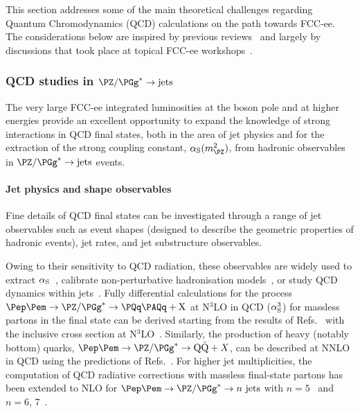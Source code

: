This section addresses some of the main theoretical challenges regarding Quantum Chromodynamics (QCD) calculations on the path towards FCC-ee.
The considerations below are inspired by previous reviews~\cite{Monni:2021rcz} 
and largely by discussions that took place at topical FCC-ee workshops~\cite{EWPrecisionWshop,QCDPrecisionWshop}.

\subsubsection{QCD studies in \texorpdfstring{$\PZ/\PGg^*\to \text{jets}$}{Z/gamma* to jets}}
\label{sec:QCDZdec}

The very large FCC-ee integrated luminosities at the \PZ boson pole and at higher energies 
provide an excellent opportunity to expand the
knowledge of strong interactions in QCD final states, 
both in the area of jet physics and for the extraction of the strong coupling constant, $\as(m^2_{\PZ})$, 
from hadronic observables in $\PZ/\PGg^* \to \text{jets}$ events.

\paragraph{Jet physics and shape observables}
\label{sec:evshp}

Fine details of QCD final states can be investigated through a range of jet observables 
such as event shapes (designed to describe the geometric properties of hadronic events), 
jet rates, and jet substructure observables.

Owing to their sensitivity to QCD radiation, 
these observables are widely used to extract $\alpha_{\rm S}$~\cite{dEnterria:2022hzv}, 
calibrate non-perturbative hadronisation models~\cite{Dasgupta:2003iq},  
or study QCD dynamics within jets~\cite{Marzani:2019hun}. 
Fully differential calculations for the process $\epem \to \PZ/\PGg^*\to \PQq\PAQq + {\rm X}$ at N$^3$LO in QCD ($\alpha_{\rm S}^{3}$)
for massless partons in the final state can be derived starting from the results of
Refs.~\cite{Gehrmann-DeRidder:2007vsv,Gehrmann-DeRidder:2008qsl,Weinzierl:2008iv,Weinzierl:2009ms,DelDuca:2016ily}
with the inclusive cross section at N$^3$LO~\cite{Gorishnii:1990vf}. 
Similarly, the production of heavy (notably bottom) quarks, 
$\epem \to \PZ/\PGg^* \to \mathrm{Q}\bar{\mathrm{Q}} + X$, can be described at NNLO in QCD 
using the predictions of Refs.~\cite{Bernreuther:1997jn,Nason:1997tz,Nason:1997nw,Chetyrkin:2000zk}.
For higher jet multiplicities, 
the computation of QCD radiative corrections with massless final-state partons has been extended to NLO
for $\epem \to \PZ/\PGg^* \to n ~ \text{jets}$ with $n=5$~\cite{Frederix:2010ne} and $n=6$, 7~\cite{Becker:2011vg}.

